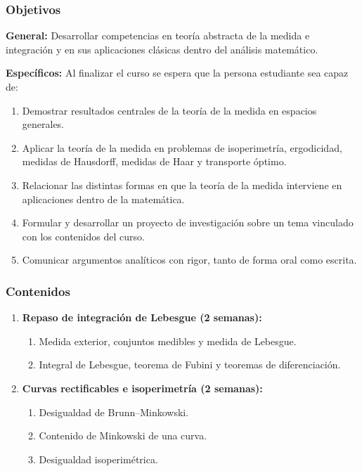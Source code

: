 \begin{refsection}
\subsubsection*{Objetivos}

\textbf{General:} Desarrollar competencias en teoría abstracta de la medida e integración y en sus aplicaciones clásicas dentro del análisis matemático.

\textbf{Específicos:} Al finalizar el curso se espera que la persona estudiante sea capaz de:

\begin{enumerate}
\item Demostrar resultados centrales de la teoría de la medida en espacios generales.
\item Aplicar la teoría de la medida en problemas de isoperimetría, ergodicidad, medidas de Hausdorff, medidas de Haar y transporte óptimo.
\item Relacionar las distintas formas en que la teoría de la medida interviene en aplicaciones dentro de la matemática.
\item Formular y desarrollar un proyecto de investigación sobre un tema vinculado con los contenidos del curso.
\item Comunicar argumentos analíticos con rigor, tanto de forma oral como escrita.
\end{enumerate}

\subsubsection*{Contenidos}

\begin{enumerate}

\item \textbf{Repaso de integración de Lebesgue (2 semanas):}
\begin{enumerate}
    \item Medida exterior, conjuntos medibles y medida de Lebesgue.
    \item Integral de Lebesgue, teorema de Fubini y teoremas de diferenciación.
\end{enumerate}

\item \textbf{Curvas rectificables e isoperimetría (2 semanas):}
\begin{enumerate}
    \item Desigualdad de Brunn--Minkowski.
    \item Contenido de Minkowski de una curva.
    \item Desigualdad isoperimétrica.
\end{enumerate}


\end{enumerate}
\end{refsection}
